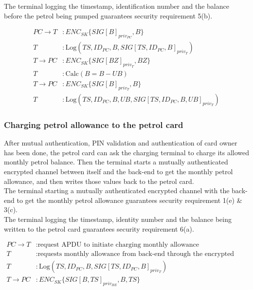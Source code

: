 The terminal logging the timestamp, identification number and the balance before the petrol being pumped guarantees security requirement 5(b).

\begin{equation}\nonumber
\begin{split}
PC \to T&: ENC_{SK}\{SIG[B]_{priv_{PC}}, B\}\\
T&: \text{Log}(TS, ID_{PC}, B, SIG[TS, ID_{PC}, B]_{priv_T}) \\
T \to PC&: ENC_{SK}\{SIG[BZ]_{priv_T}, BZ\}\\
T&: \text{Calc}(B = B - UB)\\
T \to PC&: ENC_{SK}\{SIG[B]_{priv_T}, B\}\\
T&: \text{Log}(TS, ID_{PC}, B, UB, SIG[TS, ID_{PC}, B, UB]_{priv_T})
\end{split} 
\end{equation}


\subsubsection{Charging petrol allowance to the petrol card}
After mutual authentication, PIN validation and authentication of card owner
has been done, the petrol card can ask the charging terminal to charge its
allowed monthly petrol balance. Then the terminal starts a mutually
authenticated encrypted channel between itself and the back-end to get the monthly petrol allowance, and then
writes those values back to the petrol card.\\

The terminal starting a mutually authenticated encrypted channel with the back-end to get the monthly petrol allowance guarantees security requirement 1(e) \& 3(c).\\

The terminal logging the timestamp, identity number and the balance being written to the petrol card guarantees security requirement 6(a).

\begin{equation}\nonumber
\begin{split}
PC \to T&: \text{request APDU to initiate charging monthly allowance} \\
T&: \text{requests monthly allowance from back-end through the encrypted channel} \\
T&: \text{Log}(TS, ID_{PC}, B, SIG[TS, ID_{PC}, B]_{priv_T}) \\
T \to PC&: ENC_{SK}\{SIG[B,TS]_{priv_{BE}}, B, TS\}
\end{split} 
\end{equation}

